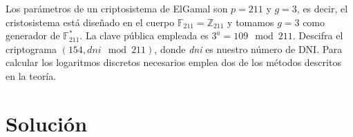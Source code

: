 	Los parámetros  de un criptosistema de ElGamal son $p = 211$ y $g = 3$, es decir, el cristosistema está
	diseñado en el cuerpo $\mathbb{F}_{211} = \mathbb{Z}_{211}$ y tomamos $g = 3$ como generador de
	$\mathbb{F}^*_{211}$. La clave pública empleada es $3^a = 109  \mod 211$. Descifra el criptograma
	$(154, \textit{dni} \mod 211)$, donde \textit{dni} es nuestro número de DNI. Para calcular los logaritmos
	discretos necesarios emplea dos de los métodos descritos en la teoría.
\section*{Solución}